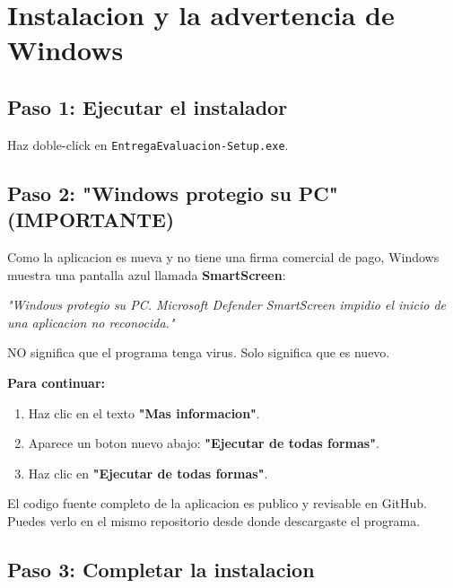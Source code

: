 \documentclass[11pt,a4paper,oneside]{report}
\begin{document}
\chapter{Instalacion y la advertencia de Windows}

\section{Paso 1: Ejecutar el instalador}

Haz doble-click en \texttt{EntregaEvaluacion-Setup.exe}.

\section{Paso 2: "Windows protegio su PC" (IMPORTANTE)}

\begin{warnbox}
Como la aplicacion es nueva y no tiene una firma comercial de pago, Windows
muestra una pantalla azul llamada \textbf{SmartScreen}:

\vspace{4pt}
\textit{"Windows protegio su PC. Microsoft Defender SmartScreen impidio el
inicio de una aplicacion no reconocida."}
\vspace{4pt}

NO significa que el programa tenga virus. Solo significa que es nuevo.
\end{warnbox}

\textbf{Para continuar:}

\begin{enumerate}
  \item Haz clic en el texto \textbf{"Mas informacion"}.
  \item Aparece un boton nuevo abajo: \textbf{"Ejecutar de todas formas"}.
  \item Haz clic en \textbf{"Ejecutar de todas formas"}.
\end{enumerate}

\begin{notebox}
El codigo fuente completo de la aplicacion es publico y revisable en GitHub.
Puedes verlo en el mismo repositorio desde donde descargaste el programa.
\end{notebox}

\section{Paso 3: Completar la instalacion}
\end{document}
